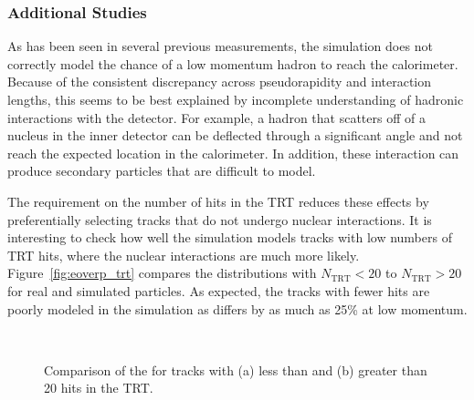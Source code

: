 \subsubsection{Additional Studies}
\label{sec:additional}

As has been seen in several previous measurements, the simulation does not correctly model the chance of a low momentum hadron to reach the calorimeter.
Because of the consistent discrepancy across pseudorapidity and interaction lengths, this seems to be best explained by incomplete understanding of hadronic interactions with the detector.
For example, a hadron that scatters off of a nucleus in the inner detector can be deflected through a significant angle and not reach the expected location in the calorimeter.
In addition, these interaction can produce secondary particles that are difficult to model.

The requirement on the number of hits in the TRT reduces these effects by preferentially selecting tracks that do not undergo nuclear interactions.
It is interesting to check how well the simulation models tracks with low numbers of TRT hits, where the nuclear interactions are much more likely. 
Figure~\ref{fig:eoverp_trt} compares the distributions with $N_{\mathrm{TRT}} < 20$ to $N_{\mathrm{TRT}} > 20$ for real and simulated particles.
As expected, the tracks with fewer hits are poorly modeled in the simulation as \epcor differs by as much as 25\% at low momentum.

\begin{figure}[h]
\centering
{}
~
\caption{Comparison of the \epcor for tracks with (a) less than and (b) greater than 20 hits in the TRT.}
\label{fig-zerofracTRT}
\end{figure}

